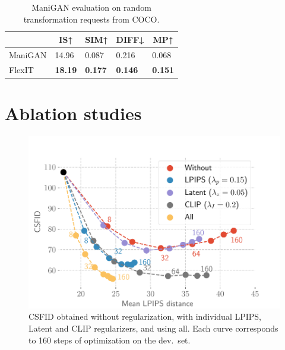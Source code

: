 \begin{table}[H]
\small
\centering
\begin{tabular}{l|l|l|l|l|}
\cline{2-5}
                              & \multicolumn{1}{c|}{IS↑} & \multicolumn{1}{c|}{SIM↑} & \multicolumn{1}{c|}{DIFF↓}             & \multicolumn{1}{c|}{MP↑} \\ \hline
\multicolumn{1}{|l|}{ManiGAN} & 14.96                   & 0.087                    & 0.216                                 & 0.068                   \\ \hline
\multicolumn{1}{|l|}{FlexIT}  & \textbf{18.19}          & \textbf{0.177}           & {\color[HTML]{000000} \textbf{0.146}} & \textbf{0.151}          \\ \hline
\end{tabular}
\caption{ManiGAN evaluation on random transformation requests from COCO.}
\label{results_manigan}
\end{table}


\section{Ablation studies\label{ablations}}


\begin{figure}
    \centering
    \vspace{-1em}
    \includegraphics[width=\linewidth]{images/flexit/assets/reg_evol.pdf}
    \caption{\ac{CSFID} obtained without regularization, with individual \ac{LPIPS}, Latent and \ac{CLIP} regularizers, and using all. 
    Each curve corresponds to 160 steps of optimization on the dev.\ set. 
    }
    \label{fig:regul}
\end{figure}

